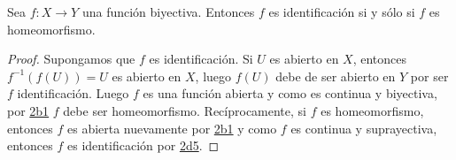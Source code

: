 
\begin{proposition}
Sea $f : X \longrightarrow Y$ una función biyectiva. Entonces $f$ es identificación si y sólo si $f$ es homeomorfismo.
\end{proposition}

\begin{proof}
Supongamos que $f$ es identificación. Si $U$ es abierto en $X$, entonces $f^{-1}(f(U)) = U$ es abierto en $X$, luego $f(U)$ debe de ser abierto en $Y$ por ser $f$ identificación. Luego $f$ es una función abierta y como es continua y biyectiva, por \hyperref[card:2b1]{\textsf{2b1}} $f$ debe ser homeomorfismo. Recíprocamente, si $f$ es homeomorfismo, entonces $f$ es abierta nuevamente por \hyperref[card:2b1]{\textsf{2b1}} y como $f$ es continua y suprayectiva, entonces $f$ es identificación por \hyperref[card:2d5]{\textsf{2d5}}.
\end{proof}
